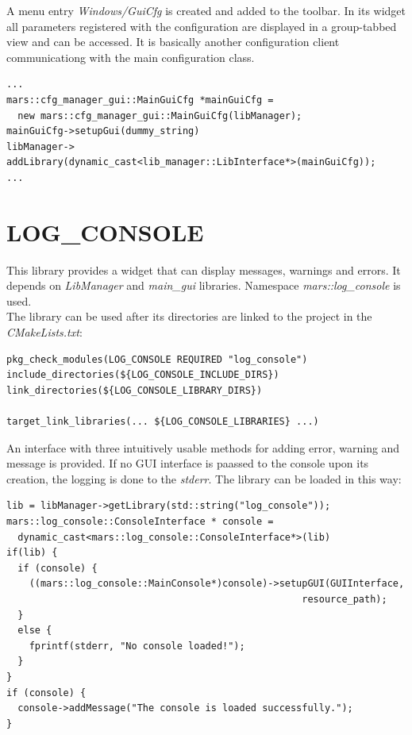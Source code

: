 \documentclass{article}
\begin{document}
A menu entry \emph{Windows/GuiCfg} is created and added to the toolbar. In its widget all parameters 
registered with the configuration are displayed in a group-tabbed view and can be accessed. It is basically
another configuration client communicationg with the main configuration class. 

\begin{lstlisting}
...
mars::cfg_manager_gui::MainGuiCfg *mainGuiCfg = 
  new mars::cfg_manager_gui::MainGuiCfg(libManager);
mainGuiCfg->setupGui(dummy_string)
libManager->
addLibrary(dynamic_cast<lib_manager::LibInterface*>(mainGuiCfg));
...
\end{lstlisting}



\section{LOG\_CONSOLE}

This library provides a widget that can display messages, warnings and errors. It depends on \emph{LibManager}
and \emph{main\_gui} libraries. Namespace \emph{mars::log\_console} is used.\\

The library can be used after its directories are linked to the project in the \emph{CMakeLists.txt}:

\begin{lstlisting}
pkg_check_modules(LOG_CONSOLE REQUIRED "log_console")
include_directories(${LOG_CONSOLE_INCLUDE_DIRS})
link_directories(${LOG_CONSOLE_LIBRARY_DIRS})

target_link_libraries(... ${LOG_CONSOLE_LIBRARIES} ...)
\end{lstlisting}

An interface with three intuitively usable methods for adding error, warning and message is provided. If no 
GUI interface is paassed to the console upon its creation, the logging is done to the \emph{stderr}.
The library can be loaded in this way:

\begin{lstlisting}
lib = libManager->getLibrary(std::string("log_console"));
mars::log_console::ConsoleInterface * console =
  dynamic_cast<mars::log_console::ConsoleInterface*>(lib)
if(lib) {
  if (console) {
    ((mars::log_console::MainConsole*)console)->setupGUI(GUIInterface,
                                                    resource_path);
  }
  else {
    fprintf(stderr, "No console loaded!");
  }
}
if (console) {
  console->addMessage("The console is loaded successfully.");
}
\end{lstlisting}
\end{document}
